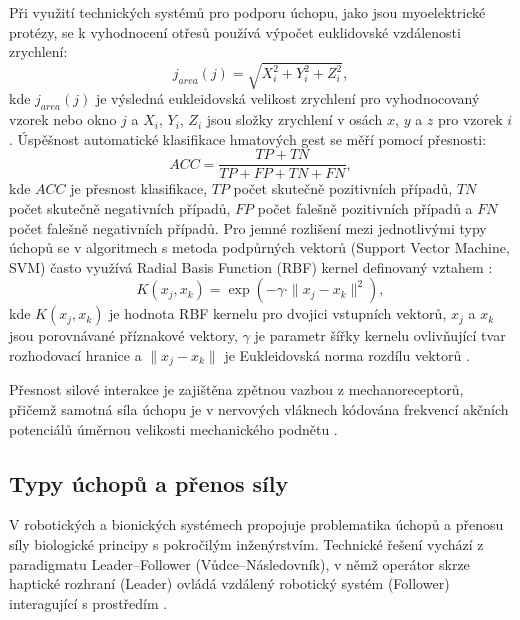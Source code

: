 \documentclass[FZS,DP]{tulthesis}
\begin{document}
Při využití technických systémů pro podporu úchopu, jako jsou myoelektrické protézy, se k vyhodnocení otřesů používá výpočet euklidovské vzdálenosti zrychlení:
\begin{equation}
j_{area}(j) = \sqrt{X_i^2 + Y_i^2 + Z_i^2},
\end{equation}
kde $j_{area}(j)$ je výsledná eukleidovská velikost zrychlení pro
vyhodnocovaný vzorek nebo okno $j$ a $X_i$, $Y_i$, $Z_i$ jsou složky
zrychlení v osách $x$, $y$ a $z$ pro vzorek $i$.
Úspěšnost automatické klasifikace hmatových gest se měří pomocí přesnosti:
\begin{equation}
ACC = \frac{TP + TN}{TP + FP + TN + FN},
\end{equation}
kde $ACC$ je přesnost klasifikace, $TP$ počet skutečně pozitivních
případů, $TN$ počet skutečně negativních případů, $FP$ počet falešně
pozitivních případů a $FN$ počet falešně negativních případů.
Pro jemné rozlišení mezi jednotlivými typy úchopů se v algoritmech s metoda podpůrných vektorů (Support Vector Machine, SVM) často využívá Radial Basis Function (RBF) kernel definovaný vztahem \cite{Brazdil2020}:
\begin{equation}
K(x_j, x_k) = \exp(-\gamma \cdot \|x_j - x_k\|^2),
\end{equation}
kde $K(x_j,x_k)$ je hodnota RBF kernelu pro dvojici vstupních vektorů,
$x_j$ a $x_k$ jsou porovnávané příznakové vektory, $\gamma$ je parametr
šířky kernelu ovlivňující tvar rozhodovací hranice a $\|x_j-x_k\|$ je
Eukleidovská norma rozdílu vektorů \cite{Brazdil2020}.

Přesnost silové interakce je zajištěna zpětnou vazbou z mechanoreceptorů, přičemž samotná síla úchopu je v nervových vláknech kódována frekvencí akčních potenciálů úměrnou velikosti mechanického podnětu \cite{Stuchla2024}.

\subsection{Typy úchopů a přenos síly}

V robotických a bionických systémech propojuje problematika úchopů a přenosu síly biologické principy s pokročilým inženýrstvím. Technické řešení vychází z paradigmatu Leader--Follower (Vůdce--Následovník), v němž operátor skrze haptické rozhraní (Leader) ovládá vzdálený robotický systém (Follower) interagující s prostředím \cite{GIUDICI2025}.
\end{document}
